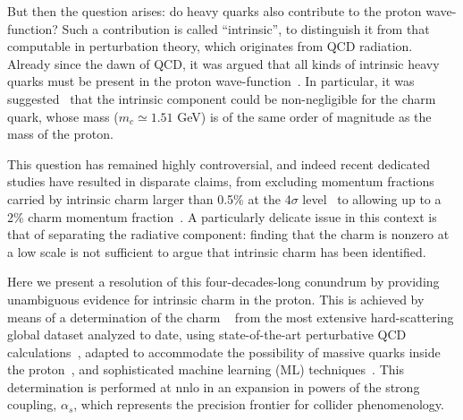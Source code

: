 But then the question arises: do heavy quarks also contribute to the
proton wave-function? Such a contribution is called ``intrinsic'', to
distinguish it from that computable in
perturbation theory, which originates from QCD radiation.
%
Already since the dawn of QCD, it
was argued that all kinds of intrinsic heavy quarks must be
present in the
proton wave-function~\cite{Brodsky:1984nx}.
%
In particular, it was
suggested~\cite{Brodsky:1980pb}
that the intrinsic component could be non-negligible for the
charm quark, whose mass ($m_c\simeq 1.51$ GeV) is of the same order of
magnitude as the mass of the proton.

This question has remained highly controversial, and indeed recent
dedicated studies have resulted in disparate claims,
from excluding momentum fractions carried by intrinsic  charm larger than 0.5\% at the 4$\sigma$
level~\cite{Jimenez-Delgado:2014zga} to allowing up to a 2\% charm momentum
fraction~\cite{Hou:2017khm}.
%
A particularly delicate issue in this context is that of
separating the radiative component: finding that the charm \pdf
is nonzero at a low scale is not sufficient to argue that intrinsic charm
has been identified.

Here we present a resolution of this four-decades-long conundrum
by providing unambiguous evidence for intrinsic charm  in the proton.
%
This is achieved by means of a determination of the charm
\pdf~\cite{Ball:2021leu} from the most extensive hard-scattering  global dataset
analyzed to date, using state-of-the-art perturbative QCD
calculations~\cite{Heinrich:2020ybq}, adapted to accommodate the possibility of
massive quarks inside the proton~\cite{Forte:2010ta,Ball:2015dpa,Ball:2015tna},
and sophisticated machine learning (ML)
techniques~\cite{Ball:2016neh,Ball:2017nwa,Ball:2021leu}.
This determination is performed at \acrfull{nnlo} in an expansion in powers of
the strong coupling, $\alpha_s$, which represents the precision frontier for
collider phenomenology.
%

